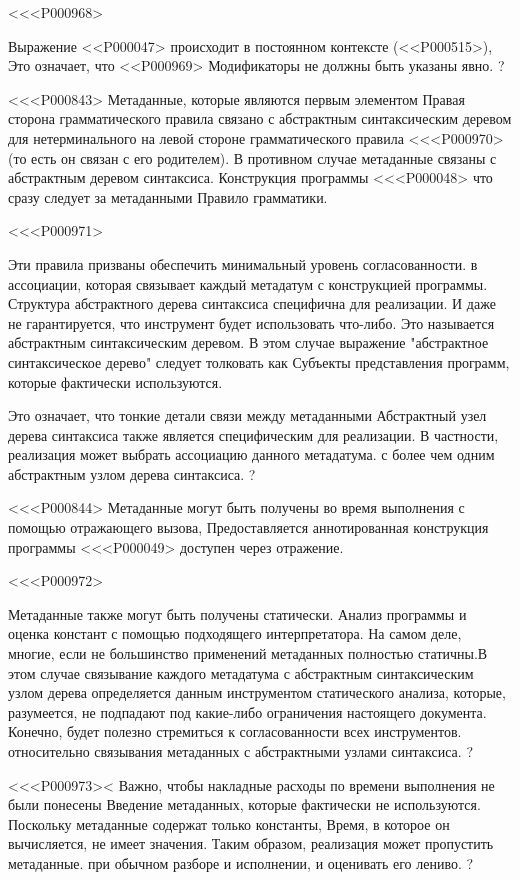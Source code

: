 {{{{{{<<<P000968>{%
Выражение <<P000047> происходит в постоянном контексте
(<<P000515>),
Это означает, что <<P000969> Модификаторы не должны быть указаны явно.%
?

<<<P000843>%
Метаданные, которые являются первым элементом
Правая сторона грамматического правила
связано с абстрактным синтаксическим деревом для нетерминального
на левой стороне грамматического правила
<<<P000970>{(то есть он связан с его родителем)}.
В противном случае метаданные связаны с абстрактным деревом синтаксиса.
Конструкция программы <<<P000048> что сразу следует за метаданными
Правило грамматики.

<<<P000971>{%
Эти правила призваны обеспечить минимальный уровень согласованности.
в ассоциации, которая связывает каждый метадатум с конструкцией программы.
Структура абстрактного дерева синтаксиса специфична для реализации.
И даже не гарантируется, что инструмент будет использовать что-либо.
Это называется абстрактным синтаксическим деревом.
В этом случае выражение "абстрактное синтаксическое дерево" следует толковать как
Субъекты представления программ, которые фактически используются.

Это означает, что тонкие детали связи между метаданными
Абстрактный узел дерева синтаксиса также является специфическим для реализации.
В частности, реализация может выбрать ассоциацию данного метадатума.
с более чем одним абстрактным узлом дерева синтаксиса.%
?

<<<P000844>%
Метаданные могут быть получены во время выполнения с помощью отражающего вызова,
Предоставляется аннотированная конструкция программы <<<P000049> доступен через отражение.

<<<P000972>{%
Метаданные также могут быть получены статически.
Анализ программы и оценка констант с помощью подходящего интерпретатора.
На самом деле, многие, если не большинство применений метаданных полностью статичны.В этом случае связывание каждого метадатума с абстрактным синтаксическим узлом дерева
определяется данным инструментом статического анализа,
которые, разумеется, не подпадают под какие-либо ограничения настоящего документа.
Конечно, будет полезно стремиться к согласованности всех инструментов.
относительно связывания метаданных с абстрактными узлами синтаксиса.%
?

<<<P000973><%
Важно, чтобы накладные расходы по времени выполнения не были понесены
Введение метаданных, которые фактически не используются.
Поскольку метаданные содержат только константы,
Время, в которое он вычисляется, не имеет значения.
Таким образом, реализация может пропустить метаданные.
при обычном разборе и исполнении,
и оценивать его лениво.%
?

}}}}}}}}}
